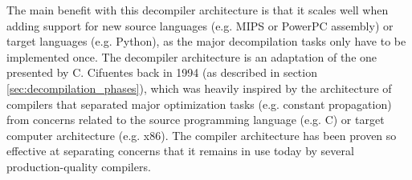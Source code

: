 
The main benefit with this decompiler architecture is that it scales well when adding support for new source languages (e.g. MIPS or PowerPC assembly) or target languages (e.g. Python), as the major decompilation tasks only have to be implemented once. The decompiler architecture is an adaptation of the one presented by C. Cifuentes back in 1994 (as described in section \ref{sec:decompilation_phases}), which was heavily inspired by the architecture of compilers that separated major optimization tasks (e.g. constant propagation) from concerns related to the source programming language (e.g. C) or target computer architecture (e.g. x86). The compiler architecture has been proven so effective at separating concerns that it remains in use today by several production-quality compilers. %
